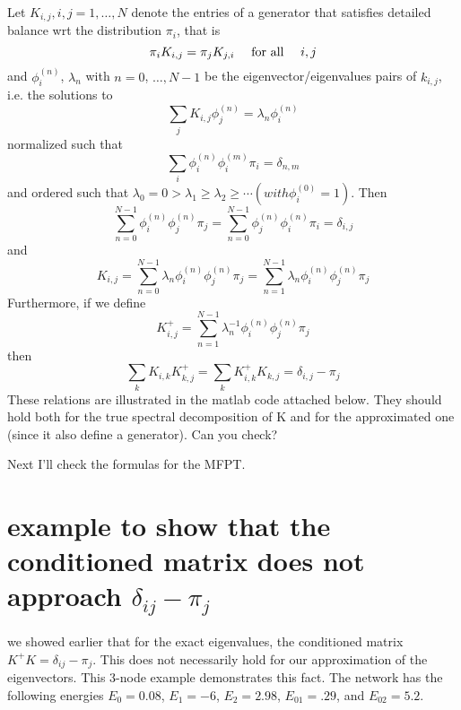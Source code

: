 \documentclass[a4paper]{article}
\begin{document}
Let $K_{i,j} , i,j=1,\ldots, N$ denote the entries of a generator that satisfies detailed balance wrt the distribution $\pi_i$, that is
\begin{equation}
\pi_i K_{i,j} = \pi_j K_{j,i} 		\text{ \quad   for all \quad    }  i,j
\end{equation}
and $\phi_i^{(n)}$, $\lambda_n$ with $n=0$, $\ldots, N-1$ be the eigenvector/eigenvalues pairs of $k_{i,j}$, i.e. the solutions to
\begin{equation}
\sum_j K_{i,j} \phi_j^{(n)} = \lambda_n \phi_i^{(n)}
\end{equation}
normalized such that
\begin{equation}
\sum_{i} \phi_i^{(n)} \phi_i^{(m)} \pi_i = \delta_{n,m}
\end{equation}
and ordered such that $\lambda_0 = 0 > \lambda_1 \ge \lambda_2 \ge \cdots (with \phi_i^{(0)} = 1)$. 
Then
\begin{equation}
\sum_{n=0}^{N-1} \phi_i^{(n)} \phi_j^{(n)} \pi_j = \sum_{n=0}^{N-1} \phi_j^{(n)} \phi_i^{(n)} \pi_i = \delta_{i,j} 
\end{equation}
and
\begin{equation}
K_{i,j} = \sum_{n=0}^{N-1} \lambda_n \phi_i^{(n)} \phi_j^{(n)} \pi_j = \sum_{n=1}^{N-1} \lambda_n \phi_i^{(n)} \phi_j^{(n)} \pi_j
\end{equation}
Furthermore, if we define
\begin{equation}
K^+_{i,j} = \sum_{n=1}^{N-1} \lambda_n^{-1} \phi_i^{(n)} \phi_j^{(n)} \pi_j
\end{equation}
then
\begin{equation}
\sum_k K_{i,k} K^+_{k,j} = \sum_k K^+_{i,k} K_{k,j} = \delta_{i,j} - \pi_j 
\end{equation}
These relations are illustrated in the matlab code attached below. They should hold both for the true spectral 
decomposition of K and for the approximated one (since it also define a generator). Can you check?

Next I’ll check the formulas for the MFPT.


\section{example to show that the conditioned matrix does not approach $\delta_{ij} - \pi_j$}
we showed earlier that for the exact eigenvalues, the conditioned matrix $K^+ K = \delta_{ij} - \pi_j$.
This does not necessarily hold for our approximation of the eigenvectors.  This 3-node example demonstrates
this fact.
The network has the following energies 
$E_0 = 0.08$,
$E_1 = -6$,
$E_2 = 2.98$,
$E_{01} = .29$,
and
$E_{02} = 5.2$.
\end{document}

